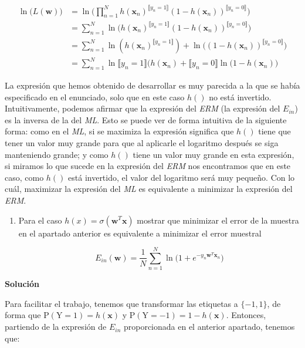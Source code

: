 \documentclass[11pt,a4paper]{article}
\newcommand{\answer}{\noindent\textbf{Solución}}
\begin{document}
\begin{equation}
\begin{split}
	\ln \Big( L(\mathbf{w}) \Big) &= \ln \Bigg( \prod_{n=1}^N
	h(\mathbf{x}_n)^{\llbracket y_n = 1 \rrbracket} (1 - h(\mathbf{x}_n))^{\llbracket y_n = 0 \rrbracket} \Bigg) \\
	&= \sum_{n=1}^N \ln \Big(
	h(\mathbf{x}_n)^{\llbracket y_n = 1 \rrbracket} (1 - h(\mathbf{x}_n))^{\llbracket y_n = 0 \rrbracket} \Big) \\
	&= \sum_{n=1}^N
	\ln (h(\mathbf{x}_n)^{\llbracket y_n = 1 \rrbracket}) + \ln \Big( (1 - h(\mathbf{x}_n))^{\llbracket y_n = 0 \rrbracket}
	\Big) \\
	&= \sum_{n=1}^N
	\ln \llbracket y_n = 1 \rrbracket (h(\mathbf{x}_n) + \llbracket y_n = 0 \rrbracket \ln \Big( 1 - h(\mathbf{x}_n) \Big)
\end{split}
\end{equation}

La expresión que hemos obtenido de desarrollar es muy parecida a la que se había especificado en el enunciado, solo que
en este caso $h()$ no está invertido. Intuitivamente, podemos afirmar que la expresión del \textit{ERM} (la expresión del
$E_{in}$) es la inversa de la del \textit{ML}. Esto se puede ver de forma intuitiva de la siguiente forma: como en el
\textit{ML}, si se maximiza la expresión significa que $h()$ tiene que tener un valor muy grande para que al aplicarle el
logaritmo después se siga manteniendo grande; y como $h()$ tiene un valor muy grande en esta expresión, si miramos lo que
sucede en la expresión del \textit{ERM} nos encontramos que en este caso, como $h()$ está invertido, el valor del logaritmo
será muy pequeño. Con lo cuál, maximizar la expresión del \textit{ML} es equivalente a minimizar la expresión del
\textit{ERM}.

\begin{enumerate}[resume,label=\textit{\alph*})]
	\item Para el caso $h(x) = \sigma (\mathbf{w}^T\mathbf{x})$ mostrar que minimizar el error de la muestra en el apartado
	anterior es equivalente a minimizar el error muestral
	
	\[E_{in}(\mathbf{w}) = \frac{1}{N} \sum_{n=1}^N \ln \bigg( 1 + e^{-y_n\mathbf{w}^T\mathbf{x}_n} \bigg)\]
\end{enumerate}

\answer

Para facilitar el trabajo, tenemos que transformar las etiquetas a $\lbrace -1, 1 \rbrace$, de forma que
$\text{P} (\text{Y} = 1) = h(\mathbf{x})$ y $\text{P} (\text{Y} = -1) = 1 - h(\mathbf{x})$. Entonces, partiendo de la
expresión de $E_{in}$ proporcionada en el anterior apartado, tenemos que:
\end{document}
